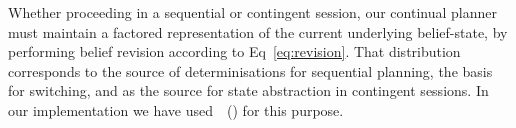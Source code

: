 

Whether proceeding in a sequential or contingent session, our
continual planner must maintain a factored representation of the
current underlying belief-state, by performing belief revision
according to Eq~\ref{eq:revision}. That distribution corresponds to
the source of determinisations for sequential planning, the basis for
switching, and as the source for state abstraction in contingent
sessions. In our implementation we have
used~\citeauthor{king:2009}~(\citeyear{king:2009}) for this purpose.
